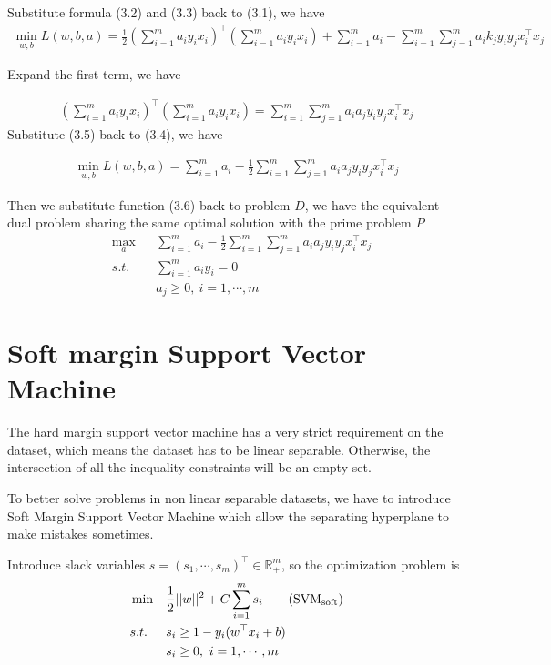 \documentclass[a4paper]{report}
\begin{document}
Substitute formula (3.2) and (3.3) back to (3.1), we have
\begin{align}
    \min_{w,b} L(w,b,a) = \frac{1}{2}\left( \sum_{i=1}^m a_i y_i x_i \right)^\top \left( \sum_{i=1}^m a_i y_i x_i\right) + \sum_{i=1}^m a_i - \sum_{i=1}^m\sum_{j=1}^m a_i k_j y_i y_j x_i^\top x_j
\end{align}

Expand the first term, we have 

\begin{align}
    \left( \sum_{i=1}^m a_i y_i x_i \right)^\top \left( \sum_{i=1}^m a_i y_i x_i\right)= \sum_{i=1}^m\sum_{j=1}^m a_i a_j y_i y_j x_i^\top x_j
\end{align}
Substitute (3.5) back to (3.4), we have

\begin{align}
    \min_{w,b} L(w,b,a) = \sum_{i=1}^m a_i - \frac{1}{2} \sum_{i=1}^m\sum_{j=1}^m a_i a_j y_i y_j x_i^\top x_j
\end{align}

Then we substitute function (3.6) back to problem $D$, we have the equivalent dual problem sharing the same optimal solution with the prime problem $P$
\begin{align*}
    &\max_a & & \sum_{i=1}^m a_i - \frac{1}{2} \sum_{i=1}^m\sum_{j=1}^m a_i a_j y_i y_j x_i^\top x_j \\
    &s.t. \ & & \sum_{i=1}^m a_i y_i=0 \\
    & & & a_j\geq 0,\ i=1,\cdots,m
\end{align*}


\section{Soft margin Support Vector Machine}

The hard margin support vector machine has a very strict requirement on the dataset, which means the dataset has to be linear separable. Otherwise, the intersection of all the inequality constraints will be an empty set.

To better solve problems in non linear separable datasets, we have to introduce Soft Margin Support Vector Machine which allow the separating hyperplane to make mistakes sometimes.

Introduce slack variables $s=(s_1,\cdots,s_m)^\top\in\mathbb R_+^m$, so the optimization problem is
\begin{align*}
    &\min & & \frac{1}{2} ||w||^2 + C\sum_{i=1}^m s_i \label{svmsoft}\tag{$\mathrm{SVM_{soft}}$} \\
    &s.t. & & s_i  \geq 1 - y_i(w^\top x_i +b)\\
    &     & & s_i \geq 0, \ i=1,\cdots,m
\end{align*}
\end{document}
